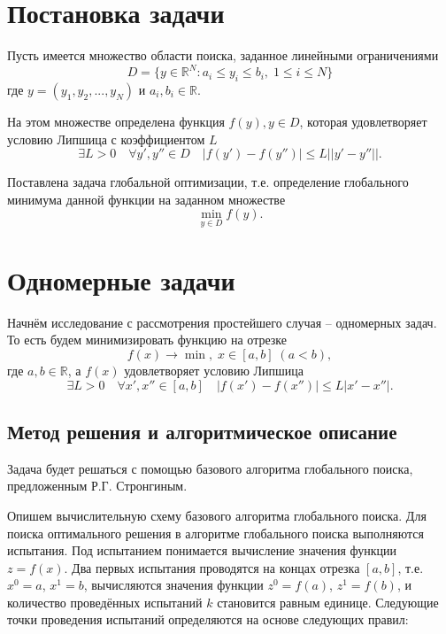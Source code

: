 \section{Постановка задачи}
Пусть имеется множество области поиска, заданное линейными ограничениями
\begin{equation}
    D = \{ y \in \mathbb{R}^N : a_i \le y_i \le b_i, \; 1 \le i \le N \}
\end{equation}
где $y=(y_1, y_2, ..., y_N)$ и $a_i, b_i \in \mathbb{R}$.

На этом множестве определена функция $f(y), y \in D$, которая удовлетворяет условию Липшица с коэффициентом $L$
\begin{equation}
    \exists L>0 \quad \forall y', y'' \in D \quad |f(y') - f(y'')| \le L ||y' - y''||.
\end{equation}

Поставлена задача глобальной оптимизации, т.е. определение глобального минимума данной функции на заданном множестве
\begin{equation}
    \min_{y \in D}{f(y)}.
\end{equation}


\section{Одномерные задачи}
Начнём исследование с рассмотрения простейшего случая – одномерных задач. То есть будем минимизировать функцию на отрезке
\begin{equation}
    f(x) \to \min, \; x \in [a, b] \; (a < b),
\end{equation}
где $a, b \in \mathbb{R}$, а $f(x)$ удовлетворяет условию Липшица
\begin{equation}
    \exists L>0 \quad \forall x', x'' \in [a,b] \quad |f(x') - f(x'')| \le L |x' - x''|.
\end{equation}

\subsection{Метод решения и алгоритмическое описание}
Задача будет решаться с помощью базового алгоритма глобального поиска, предложенным Р.Г. Стронгиным.

Опишем вычислительную схему базового алгоритма глобального поиска. Для поиска оптимального решения в алгоритме глобального поиска выполняются испытания. Под испытанием понимается вычисление значения функции $z=f(x)$. Два первых испытания проводятся на концах отрезка $[a,b]$, т.е. $x^0=a$, $x^1=b$, вычисляются значения функции $z^0=f(a)$, $z^1=f(b)$, и количество проведённых испытаний $k$ становится равным единице. Следующие точки проведения испытаний определяются на основе следующих правил:

















